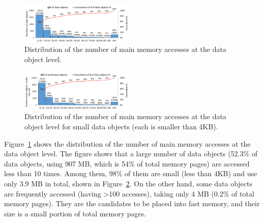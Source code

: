 
\begin{figure}[!t]
\centering
\includegraphics[width=0.48\textwidth]{figures/figure2.pdf}
\caption{Distribution of the number of main memory accesses at the data object level.}
\label{fig:tensor_access}
\end{figure}

\begin{figure}[!t]
\centering
\includegraphics[width=0.48\textwidth]{figures/figure3.pdf}
\caption{Distribution of the number of main memory accesses at the data object level for small data objects (each is smaller than 4KB).}
\label{fig:small_tensor_access}
\end{figure}


Figure~\ref{fig:tensor_access} shows the distribution of the number of main memory accesses at the data object level. 
The figure shows that a large number of data objects (52.3\% of data objects, using 907 MB, which is 54\% of total memory pages) are accessed less than 10 times. Among them, 98\% of them are small (\textcolor{dong2}{less than 4KB}) and use only 3.9 MB in total, shown in Figure~\ref{fig:small_tensor_access}. On the other hand, some data objects are frequently accessed (having >100 accesses), taking only 4 MB (0.2\% of total memory pages). They are the candidates to be placed into fast memory, and their size is a small portion of total memory pages. 



